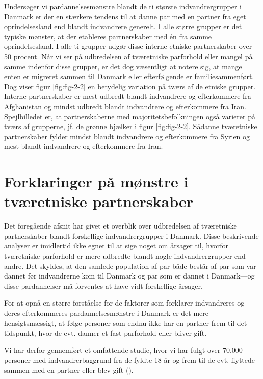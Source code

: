 \documentclass[
]{book}
\begin{document}
Undersøger vi pardannelsesmønstre blandt de ti største indvandrergrupper i Danmark er der en stærkere tendens til at danne par med en partner fra eget oprindelsesland end blandt indvandrere generelt. I alle større grupper er det typiske mønster, at der etableres partnerskaber med én fra samme oprindelsesland. I alle ti grupper udgør disse interne etniske partnerskaber over 50 procent. Når vi ser på udbredelsen af tværetniske parforhold eller mangel på samme indenfor disse grupper, er det dog væsentligt at notere sig, at mange enten er migreret sammen til Danmark eller efterfølgende er familiesammenført. Dog viser figur \ref{fig:fig-2-2} en betydelig variation på tværs af de etniske grupper. Interne partnerskaber er mest udbredt blandt indvandrere og efterkommere fra Afghanistan og mindst udbredt blandt indvandrere og efterkommere fra Iran. Spejlbilledet er, at partnerskaberne med majoritetsbefolkningen også varierer på tværs af grupperne, jf. de grønne bjælker i figur \ref{fig:fig-2-2}. Sådanne tværetniske partnerskaber fylder mindst blandt indvandrere og efterkommere fra Syrien og mest blandt indvandrere og efterkommere fra Iran.

\section{Forklaringer på mønstre i tværetniske partnerskaber}\label{forklaringer-puxe5-muxf8nstre-i-tvuxe6retniske-partnerskaber}

Det foregående afsnit har givet et overblik over udbredelsen af tværetniske partnerskaber blandt forskellige indvandrergrupper i Danmark. Disse beskrivende analyser er imidlertid ikke egnet til at sige noget om årsager til, hvorfor tværetniske parforhold er mere udbredte blandt nogle indvandrergrupper end andre. Det skyldes, at den samlede population af par både består af par som var dannet før indvandrerne kom til Danmark og par som er dannet i Danmark---og disse pardannelser må forventes at have vidt forskellige årsager.

For at opnå en større forståelse for de faktorer som forklarer indvandreres og deres efterkommeres pardannelsesmønstre i Danmark er det mere hensigtsmæssigt, at følge personer som endnu ikke har en partner frem til det tidspunkt, hvor de evt. danner et fast parforhold eller bliver gift.

Vi har derfor gennemført et omfattende studie, hvor vi har fulgt over 70.000 personer med indvandrerbaggrund fra de fyldte 18 år og frem til de evt. flyttede sammen med en partner eller blev gift ().
\end{document}
